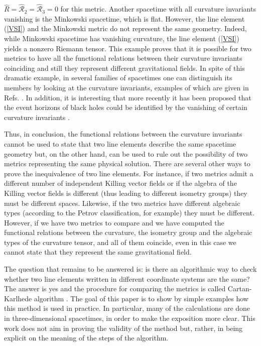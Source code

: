 \documentclass[twocolumn,prd,aps,showpacs,showkeys,amsmath,amssymb]{revtex4-1}
\begin{document}
$\hat{R}= \hat{\mathcal{R}}_2=\hat{\mathcal{R}}_3 = 0$ for this metric. Another spacetime with all curvature invariants vanishing is the Minkowski spacetime, which is flat. However, the line element (\ref{VSI}) and the Minkowski metric do not represent the same geometry. Indeed, while Minkowski spacetime has vanishing curvature, the line element (\ref{VSI}) yields a nonzero Riemann tensor. This example proves that it is possible for two metrics to have all the functional relations between their curvature invariants coinciding and still they represent different gravitational fields. In spite of this dramatic example, in several families of spacetimes one can distinguish its members by looking at the curvature invariants, examples of which are given in Refs. \cite{Poly3D,Wylleman:2019hzj}. In addition,  it is interesting that more recently it has been proposed that the event horizons of black holes could be identified by the vanishing of certain curvature invariants \cite{Horizon}.




Thus, in conclusion, the functional relations between the curvature invariants cannot be used to state that two line elements describe the same spacetime geometry but, on the other hand, can be used to rule out the possibility of two metrics representing the same physical solution. There are several other ways to prove the inequivalence of two line elements. For instance, if two metrics admit a different number of independent Killing vector fields or if the algebra of the Killing vector fields is different (thus leading to different isometry groups) they must be different spaces. Likewise, if the two metrics have different algebraic types (according to the Petrov classification, for example) they must be different. However, if we have two metrics to compare and we have computed the functional relations between the curvature, the isometry group and the algebraic types of the curvature tensor, and all of them coincide, even in this case we cannot state that they represent the same gravitational field.



The question that remains to be answered is: is there an algorithmic way to check whether two line elements written in different coordinate systems are the same? The answer is yes and the procedure for comparing the metrics is called Cartan-Karlhede algorithm \cite{Cartan,Karlhede,Brans,Olver,Wylleman:2019hzj,Milson:2012ry}. The goal of this paper is to show by simple examples how this method is used in practice. In particular, many of the calculations are done in three-dimensional spacetimes, in order to make the exposition more clear. This work does not aim in proving the validity of the method but, rather, in being explicit on the meaning of the steps of the algorithm.
\end{document}
